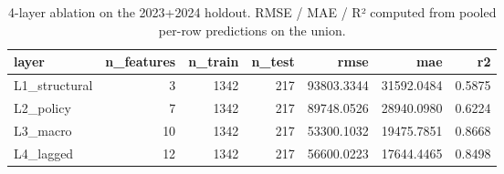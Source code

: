 \begin{table}
\caption{4-layer ablation on the 2023+2024 holdout. RMSE / MAE / R² computed from pooled per-row predictions on the union.}
\label{tbl:ch4-ablation-holdout}
\begin{tabular}{lrrrrrr}
\toprule
layer & n\_features & n\_train & n\_test & rmse & mae & r2 \\
\midrule
L1\_structural & 3 & 1342 & 217 & 93803.3344 & 31592.0484 & 0.5875 \\
L2\_policy & 7 & 1342 & 217 & 89748.0526 & 28940.0980 & 0.6224 \\
L3\_macro & 10 & 1342 & 217 & 53300.1032 & 19475.7851 & 0.8668 \\
L4\_lagged & 12 & 1342 & 217 & 56600.0223 & 17644.4465 & 0.8498 \\
\bottomrule
\end{tabular}
\end{table}
